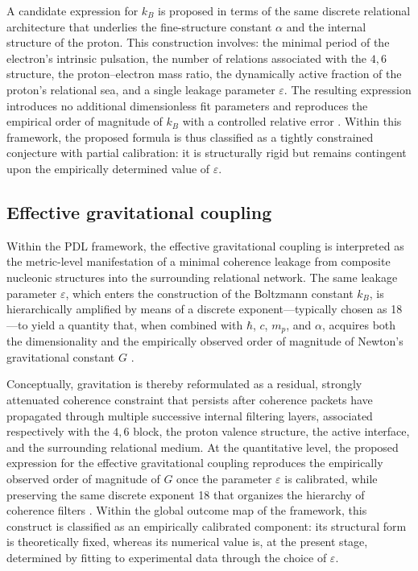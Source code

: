 \documentclass{article}
\begin{document}
A candidate expression for \(k_B\) is proposed in terms of the same discrete relational architecture that underlies the fine-structure constant \(\alpha\) and the internal structure of the proton. This construction involves: the minimal period of the electron’s intrinsic pulsation, the number of relations associated with the \(4,6\) structure, the proton–electron mass ratio, the dynamically active fraction of the proton’s relational sea, and a single leakage parameter \(\varepsilon\). The resulting expression introduces no additional dimensionless fit parameters and reproduces the empirical order of magnitude of \(k_B\) with a controlled relative error
\citep{PDL_Main_2026,Coherence_Leakage_18_2026}. Within this framework, the proposed formula is thus classified as a tightly constrained conjecture with partial calibration: it is structurally rigid but remains contingent upon the empirically determined value of \(\varepsilon\).

\subsection{Effective gravitational coupling}
\label{subsec:gravity_constant}

Within the PDL framework, the effective gravitational coupling is interpreted as the metric-level manifestation of a minimal coherence leakage from composite nucleonic structures into the surrounding relational network. The same leakage parameter \(\varepsilon\), which enters the construction of the Boltzmann constant \(k_B\), is hierarchically amplified by means of a discrete exponent—typically chosen as 18—to yield a quantity that, when combined with \(\hbar\), \(c\), \(m_p\), and \(\alpha\), acquires both the dimensionality and the empirically observed order of magnitude of Newton’s gravitational constant \(G\)
\citep{PDL_Main_2026,Exponent_18_PDL_2026,PDL_position}.

Conceptually, gravitation is thereby reformulated as a residual, strongly attenuated coherence constraint that persists after coherence packets have propagated through multiple successive internal filtering layers, associated respectively with the \(4,6\) block, the proton valence structure, the active interface, and the surrounding relational medium. At the quantitative level, the proposed expression for the effective gravitational coupling reproduces the empirically observed order of magnitude of \(G\) once the parameter \(\varepsilon\) is calibrated, while preserving the same discrete exponent 18 that organizes the hierarchy of coherence filters
\citep{Exponent_18_PDL_2026,Coherence_Leakage_18_2026}. Within the global outcome map of the framework, this construct is classified as an empirically calibrated component: its structural form is theoretically fixed, whereas its numerical value is, at the present stage, determined by fitting to experimental data through the choice of \(\varepsilon\).
\end{document}
